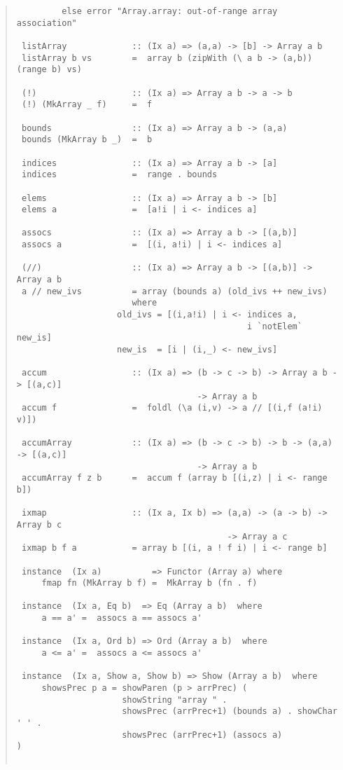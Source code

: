 \begin{quote}
{\haddockverb\begin{verbatim}
         else error "Array.array: out-of-range array association"
 
 listArray             :: (Ix a) => (a,a) -> [b] -> Array a b
 listArray b vs        =  array b (zipWith (\ a b -> (a,b)) (range b) vs)
 
 (!)                   :: (Ix a) => Array a b -> a -> b
 (!) (MkArray _ f)     =  f
 
 bounds                :: (Ix a) => Array a b -> (a,a)
 bounds (MkArray b _)  =  b
 
 indices               :: (Ix a) => Array a b -> [a]
 indices               =  range . bounds
 
 elems                 :: (Ix a) => Array a b -> [b]
 elems a               =  [a!i | i <- indices a]
 
 assocs                :: (Ix a) => Array a b -> [(a,b)]
 assocs a              =  [(i, a!i) | i <- indices a]
 
 (//)                  :: (Ix a) => Array a b -> [(a,b)] -> Array a b
 a // new_ivs          = array (bounds a) (old_ivs ++ new_ivs)
                       where
                   	old_ivs = [(i,a!i) | i <- indices a,
                                              i `notElem` new_is]
                   	new_is  = [i | (i,_) <- new_ivs]
 
 accum                 :: (Ix a) => (b -> c -> b) -> Array a b -> [(a,c)]
                                    -> Array a b
 accum f               =  foldl (\a (i,v) -> a // [(i,f (a!i) v)])
 
 accumArray            :: (Ix a) => (b -> c -> b) -> b -> (a,a) -> [(a,c)]
                                    -> Array a b
 accumArray f z b      =  accum f (array b [(i,z) | i <- range b])
 
 ixmap                 :: (Ix a, Ix b) => (a,a) -> (a -> b) -> Array b c
                                          -> Array a c
 ixmap b f a           = array b [(i, a ! f i) | i <- range b]
 
 instance  (Ix a)          => Functor (Array a) where
     fmap fn (MkArray b f) =  MkArray b (fn . f) 
 
 instance  (Ix a, Eq b)  => Eq (Array a b)  where
     a == a' =  assocs a == assocs a'
 
 instance  (Ix a, Ord b) => Ord (Array a b)  where
     a <= a' =  assocs a <= assocs a'
 
 instance  (Ix a, Show a, Show b) => Show (Array a b)  where
     showsPrec p a = showParen (p > arrPrec) (
                     showString "array " .
                     showsPrec (arrPrec+1) (bounds a) . showChar ' ' .
                     showsPrec (arrPrec+1) (assocs a)                  )
 

\end{verbatim}}
\end{quote}
